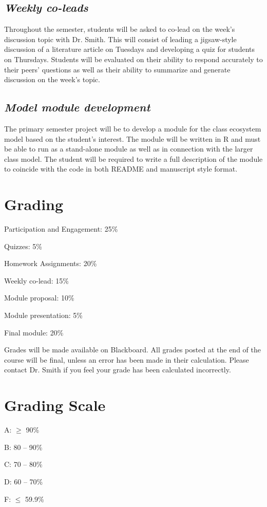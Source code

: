 \documentclass[12pt, notitlepage]{article}   	%
\begin{document}
{\subsection{\textit{Weekly co-leads}}
Throughout the semester, students will be asked to co-lead on the week's discussion
topic with Dr. Smith. This will consist of leading a jigsaw-style discussion of a literature article on Tuesdays
and developing a quiz for students on Thursdays.
Students will be evaluated on their ability to respond accurately to their peers' questions
as well as their ability to summarize and generate discussion on the week's topic.

\subsection{\textit{Model module development}}
The primary semester project will be to develop a module for the class ecosystem
model based on the student's interest. The module will be written in R and must be able to
run as a stand-alone module as well as in connection with the larger class model.
The student will be required to write a full description of the module to coincide with the
code in both README and manuscript style format.

\section{Grading}
Participation and Engagement: 25\% \par
Quizzes: 5\% \par
Homework Assignments: 20\% \par
Weekly co-lead: 15\% \par
Module proposal: 10\% \par
Module presentation: 5\% \par
Final module: 20\% \par

Grades will be made available on Blackboard. 
All grades posted at the end of the course will be final, 
unless an error has been made in their calculation.
Please contact Dr. Smith if you feel your grade has been calculated incorrectly.

\section{Grading Scale}
A: $\geq$ 90\% \par
B: 80 – 90\% \par
C: 70 – 80\% \par
D: 60 – 70\% \par
F: $\leq$ 59.9\% \par

}
\end{document}
